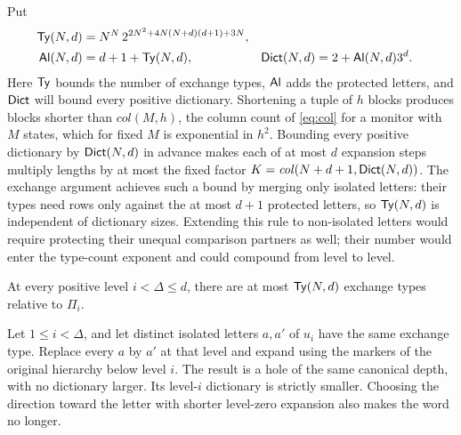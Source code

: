 Put
\begin{equation}\label{eq:dictionary-constants}
\begin{aligned}
 \mathsf{Ty}(N,d)&=N^N\,2^{2N^2+4N(N+d)(d+1)+3N},\\
 \mathsf{Al}(N,d)&=d+1+\mathsf{Ty}(N,d),&
 \mathsf{Dict}(N,d)&=2+\mathsf{Al}(N,d)3^d.
\end{aligned}
\end{equation}
Here $\mathsf{Ty}$ bounds the number of exchange types, $\mathsf{Al}$ adds the
protected letters, and $\mathsf{Dict}$ will bound every positive dictionary.
Shortening a tuple of $h$ blocks produces blocks shorter than
$\mathit{col}(M,h)$, the column count of \eqref{eq:col} for a monitor with $M$
states, which for fixed $M$ is exponential in $h^2$. Bounding every positive
dictionary by $\mathsf{Dict}(N,d)$ in advance makes each of at most $d$ expansion
steps multiply lengths by at most the fixed factor
$K=\mathit{col}(N+d+1,\mathsf{Dict}(N,d))$. The exchange argument achieves such a bound
by merging only isolated letters: their types need rows only against the
at most $d+1$ protected letters, so $\mathsf{Ty}(N,d)$ is independent of dictionary
sizes. Extending this rule to non-isolated letters would require protecting
their unequal comparison partners as well; their number would enter the
type-count exponent and could compound from level to level.

\begin{lemma}\label{lem:exchange-types}
At every positive level $i<\Delta\le d$, there are at most $\mathsf{Ty}(N,d)$
exchange types relative to $\Pi_i$.
\end{lemma}

\begin{lemma}\label{lem:isolated-exchange}
Let $1\le i<\Delta$, and let distinct isolated letters $a,a'$ of $u_i$
have the same exchange type. Replace every $a$ by $a'$ at that level
and expand using the markers of the original hierarchy below level $i$. The
result is a hole of the same canonical depth, with no dictionary larger.
Its level-$i$ dictionary is strictly smaller. Choosing
the direction toward the letter with shorter level-zero expansion also makes the
word no longer.
\end{lemma}

